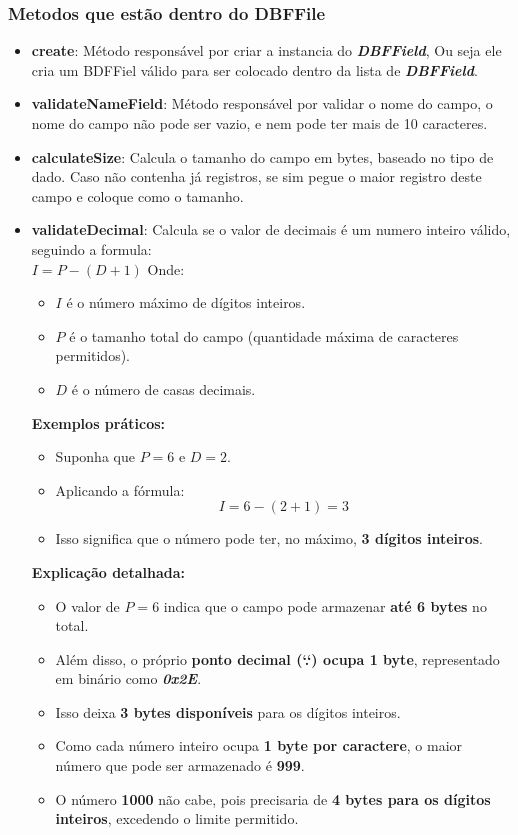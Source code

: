 \subsubsection{Metodos que estão dentro do DBFFile}
\begin{itemize}
    \item \textbf{create}: Método responsável por criar a instancia do \textit{\textbf{DBFField}}, Ou seja ele cria um BDFFiel válido para ser colocado dentro da lista de \textit{\textbf{DBFField}}.
    \item \textbf{validateNameField}: Método responsável por validar o nome do campo, o nome do campo não pode ser vazio, e nem pode ter mais de 10 caracteres. 
    \item \textbf{calculateSize}: Calcula o tamanho do campo em bytes, baseado no tipo de dado. Caso não contenha já registros, se sim pegue o maior registro deste campo e coloque como o tamanho.
    \item \textbf{validateDecimal}: Calcula se o valor de decimais é um numero inteiro válido, seguindo a formula: \\
    \subitem \( I = P - (D + 1) \)  
    \subitem Onde:  
    \begin{itemize}
        \item \( I \) é o número máximo de dígitos inteiros.  
        \item \( P \) é o tamanho total do campo (quantidade máxima de caracteres permitidos).  
        \item \( D \) é o número de casas decimais.  
    \end{itemize}
    
    \subitem \textbf{Exemplos práticos: } 
    \begin{itemize}
        \item Suponha que \( P = 6 \) e \( D = 2 \).  
        \item Aplicando a fórmula:  
        \[
        I = 6 - (2 + 1) = 3
        \]
        \item Isso significa que o número pode ter, no máximo, \textbf{3 dígitos inteiros}.  
    \end{itemize}
    
    \subitem \textbf{Explicação detalhada:}  
    \begin{itemize}
        \item O valor de \( P = 6 \) indica que o campo pode armazenar \textbf{até 6 bytes} no total.  
        \item Além disso, o próprio \textbf{ponto decimal (`.`) ocupa 1 byte}, representado em binário como \textit{\textbf{0x2E}}.  
        \item Isso deixa \textbf{3 bytes disponíveis} para os dígitos inteiros.  
        \item Como cada número inteiro ocupa \textbf{1 byte por caractere}, o maior número que pode ser armazenado é \textbf{999}.  
        \item O número \textbf{1000} não cabe, pois precisaria de \textbf{4 bytes para os dígitos inteiros}, excedendo o limite permitido.  
    \end{itemize}
\end{itemize}
